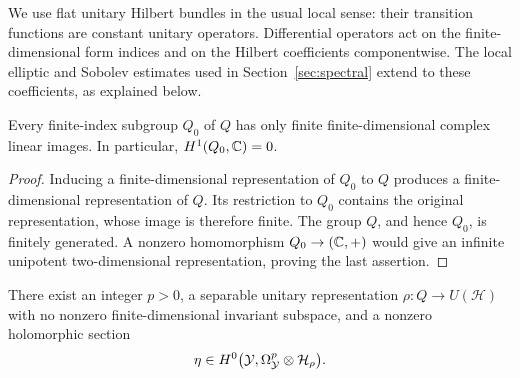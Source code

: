 We use flat unitary Hilbert bundles in the usual local sense: their
transition functions are constant unitary operators. Differential
operators act on the finite-dimensional form indices and on the
Hilbert coefficients componentwise. The local elliptic and Sobolev
estimates used in Section~\ref{sec:spectral} extend to these
coefficients, as explained below.

\begin{lemma}\label{hi:finite-images}
Every finite-index subgroup \(Q_0\) of \(Q\) has only finite
finite-dimensional complex linear images. In particular,
\(H^1(Q_0,\mathbb C)=0\).
\end{lemma}

\begin{proof}
Inducing a finite-dimensional representation of \(Q_0\) to \(Q\)
produces a finite-dimensional representation of \(Q\). Its restriction
to \(Q_0\) contains the original representation, whose image is
therefore finite. The group \(Q\), and hence \(Q_0\), is finitely
generated. A nonzero homomorphism \(Q_0\to(\mathbb C,+)\) would give an
infinite unipotent two-dimensional representation, proving the last
assertion.
\end{proof}

\begin{proposition}\label{hi:coefficients}
There exist an integer \(p>0\), a separable unitary representation
\(\rho:Q\to U(\mathcal H)\) with no nonzero finite-dimensional
invariant subspace, and a nonzero holomorphic section
\[
 \eta\in H^0\bigl(\mathcal Y,\Omega_{\mathcal Y}^p\otimes\mathcal H_\rho\bigr).
\]
\end{proposition}

